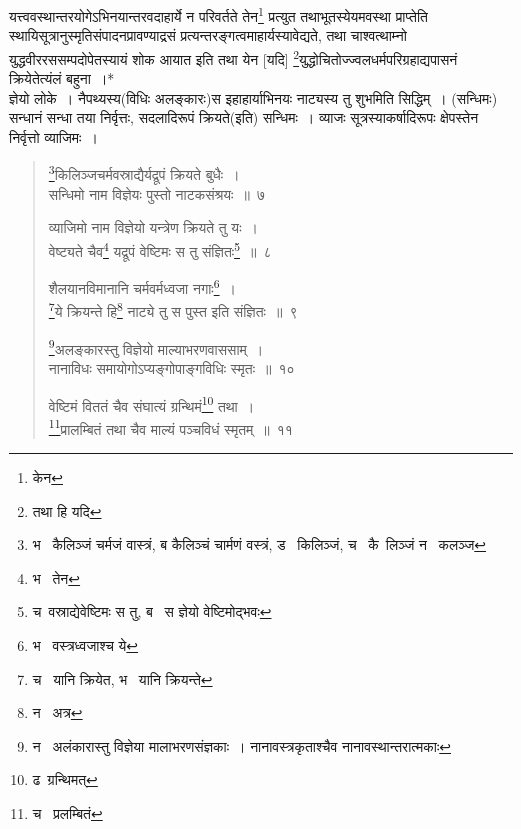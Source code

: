 \documentclass[11pt, openany]{book}
\begin{document}
यत्त्ववस्थान्तरयोगेऽभिनयान्तरवदाहार्ये न परिवर्तते तेन\renewcommand{\thefootnote}{2}\footnote{केन} प्रत्युत तथाभूतस्येयमवस्था प्राप्तेति स्थायिसूत्रानुस्मृतिसंपादनप्रावण्याद्रसं प्रत्यन्तरङ्गत्वमाहार्यस्यावेद्यते, तथा चाश्वत्थाम्नो युद्धवीररससम्पदोपेतस्यायं शोक आयात इति तथा येन [यदि] \renewcommand{\thefootnote}{3}\footnote{तथा हि यदि}युद्धोचितोज्ज्वलधर्मपरिग्रहाद्यपासनं क्रियेतेत्यंलं बहुना~।*\\

ज्ञेयो लोके~। नैपथ्यस्य(विधिः अलङ्कारः)स इहाहार्याभिनयः नाट्यस्य तु शुभमिति सिद्धिम्~। (सन्धिमः) सन्धानं सन्धा तया निर्वृत्तः, सदलादिरूपं क्रियते(इति) सन्धिमः~। व्याजः सूत्रस्याकर्षादिरूपः क्षेपस्तेन निर्वृत्तो व्याजिमः~।

\newpage

\begin{quote}
{\na \renewcommand{\thefootnote}{1}\footnote{भ \textendash\ कैलिञ्जं चर्मजं वास्त्रं, ब कैलिञ्चं चार्मणं वस्त्रं, ड \textendash\ किलिञ्जं, च \textendash\ कै\textendash\ लिञ्जं न \textendash\ कलञ्ज}किलिञ्जचर्मवस्राद्यैर्यद्रूपं क्रियते बुधैः~।\\
सन्धिमो नाम विज्ञेयः पुस्तो नाटकसंश्रयः~॥~७

व्याजिमो नाम विज्ञेयो यन्त्रेण क्रियते तु यः~।\\
वेष्ट्यते चैव\renewcommand{\thefootnote}{2}\footnote{भ \textendash\ तेन} यद्रूपं वेष्टिमः स तु संज्ञितः\renewcommand{\thefootnote}{3}\footnote{च\textendash\ वस्राद्येवेष्टिमः स तु, ब \textendash\ स ज्ञेयो वेष्टिमोद्भवः}~॥~८

शैलयानविमानानि चर्मवर्मध्वजा नगाः\renewcommand{\thefootnote}{4}\footnote{भ \textendash\ वस्त्रध्वजाश्च ये}~।\\
\renewcommand{\thefootnote}{5}\footnote{च \textendash\ यानि क्रियेत, भ \textendash\ यानि क्रियन्ते}ये क्रियन्ते हि\renewcommand{\thefootnote}{6}\footnote{न \textendash\ अत्र} नाट्ये तु स पुस्त इति संज्ञितः~॥~९

\renewcommand{\thefootnote}{7}\footnote{न \textendash\ अलंकारास्तु विज्ञेया मालाभरणसंज्ञकाः~। नानावस्त्रकृताश्चैव नानावस्थान्तरात्मकाः}अलङ्कारस्तु विज्ञेयो माल्याभरणवाससाम्~।\\
नानाविधः समायोगोऽप्यङ्गोपाङ्गविधिः स्मृतः~॥~१०

वेष्टिमं विततं चैव संघात्यं ग्रन्थिमं\renewcommand{\thefootnote}{8}\footnote{ढ\textendash\ ग्रन्थिमत्} तथा~।\\
\renewcommand{\thefootnote}{9}\footnote{च \textendash\ प्रलम्बितं}प्रालम्बितं तथा चैव माल्यं पञ्चविधं स्मृतम्~॥~११}
\end{quote}
\end{document}
